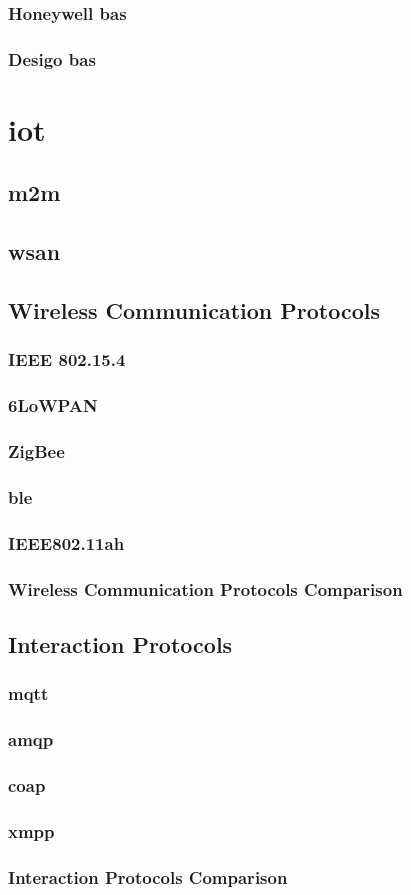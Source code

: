 \subsubsection{Honeywell \ac{bas}}
\subsubsection{Desigo \ac{bas}}
\section{\acf{iot}}
\subsection{\acf{m2m}}
\subsection{\acf{wsan}}
\subsection{Wireless Communication Protocols}
\subsubsection{IEEE 802.15.4}
\subsubsection{6LoWPAN}
\subsubsection{ZigBee}
\subsubsection{\acf{ble}}
\subsubsection{IEEE802.11ah}
\subsubsection{Wireless Communication Protocols Comparison}
\subsection{Interaction Protocols}
\subsubsection{\acf{mqtt}}
\subsubsection{\acf{amqp}}
\subsubsection{\acf{coap}}
\subsubsection{\acf{xmpp}}
\subsubsection{Interaction Protocols Comparison}